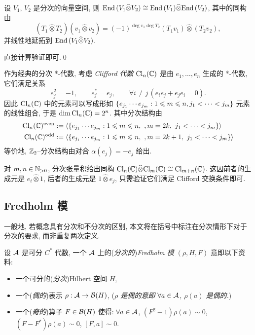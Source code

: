 \begin{Proposition}
	设 $ V_1 $, $ V_2 $ 是分次的向量空间, 则 $ \mathrm{End}\,(V_1\widehat{\otimes}V_2)\cong\mathrm{End}\,(V_1)\widehat{\otimes}\mathrm{End}\,(V_2) $, 其中的同构由
	\[
		(T_1\widehat{\otimes}T_2)(v_1\widehat{\otimes}v_2)=(-1)^{\deg v_1\deg T_2}(T_1v_1)\widehat{\otimes}(T_2v_2),
	\]
	并线性地延拓到 $ \mathrm{End}\,(V_1\widehat{\otimes}V_2) $.
\end{Proposition}
\begin{Proof}
	直接计算验证即可.\qed
\end{Proof}

作为经典的分次 *-代数, 考虑 \emph{Clifford 代数} $ \text{Cl}_n(\mathbb{C}) $ 是由 $ e_1,\dots,e_n $ 生成的 *-代数, 它们满足关系
\[
	e_j^2=-1,\qquad e_j^*=e_j,\qquad \forall i\ne j\,(e_ie_j+e_je_i=0).
\]
因此 $ \text{Cl}_n(\mathbb{C}) $ 中的元素可以写成形如 $ \left\{ e_{j_1}\cdots e_{j_m} : 1\leqslant m\leqslant n, j_1<\dots<j_m \right\} $ 元素的线性组合, 于是 $ \dim\text{Cl}_n(\mathbb{C})=2^n $. 其中分次结构由
\[
	\begin{aligned}
		\text{Cl}_n(\mathbb{C})^{\text{even}}&:=\left\langle \left\{ e_{j_1}\cdots e_{j_m} : 1\leqslant m\leqslant n,\ ,m=2k,\ j_1<\dots<j_m \right\} \right\rangle\\
		\text{Cl}_n(\mathbb{C})^{\text{odd}}&:=\left\langle \left\{ e_{j_1}\cdots e_{j_m} : 1\leqslant m\leqslant n,\ ,m=2k+1,\ j_1<\dots<j_m \right\} \right\rangle
	\end{aligned}
\]
等价地, $ \mathbb{Z}_2 $--分次结构由对合 $ \alpha(e_j)=-e_j $ 给出.

对 $ m,n\in\mathbb{N}_{>0} $, 分次张量积给出同构 $ \text{Cl}_n(\mathbb{C})\widehat{\otimes}\text{Cl}_m(\mathbb{C})\cong\text{Cl}_{m+n}(\mathbb{C}) $. 这因前者的生成元是 $ e_i\widehat{\otimes}1 $, 后者的生成元是 $ 1\widehat{\otimes}e_j $, 只需验证它们满足 Clifford 交换条件即可.

\subsection{Fredholm 模}

一般地, 若概念具有分次和不分次的区别, 本文将在括号中标注在分次情形下对于分次的要求, 而非重复两次定义.

\begin{Definition}[Fredholm 模]
	设 $ \mathcal{A} $ 是可分 $ C^* $ 代数, 一个 $ \mathcal{A} $ 上的(\textit{分次的})\emph{Fredholm 模} $ (\rho,H,F) $ 意即以下资料:
	\begin{itemize}
		\item 一个可分的(\textit{分次})Hilbert 空间 $ H $,
		\item 一个(\textit{偶的})表示 $ \rho : \mathcal{A}\to\mathcal{B}(H) $, (\textit{$ \rho $ 是偶的意即 $ \forall a\in\mathcal{A} $, $ \rho(a) $ 是偶的.})
		\item 一个(\textit{奇的})算子 $ F\in\mathcal{B}(H) $ 使得: $ \forall a\in\mathcal{A} $, $ (F^2-1)\rho(a)\sim 0 $, $ (F-F^*)\rho(a)\sim 0 $, $ [F,a]\sim 0 $.
	\end{itemize}
\end{Definition}

